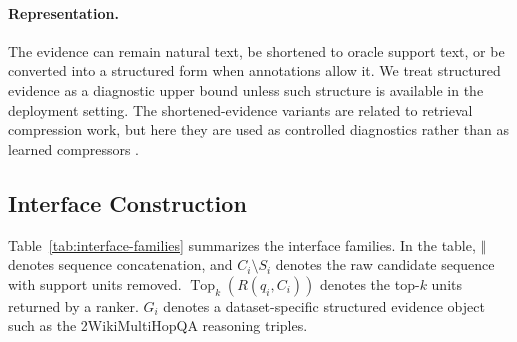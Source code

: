 \documentclass[a4paper,fleqn]{cas-sc}
\begin{document}
\paragraph{Representation.}
The evidence can remain natural text, be shortened to oracle support text, or be
converted into a structured form when annotations allow it. We treat structured
evidence as a diagnostic upper bound unless such structure is available in the
deployment setting. The shortened-evidence variants are related to retrieval
compression work, but here they are used as controlled diagnostics rather than
as learned compressors \citep{xu2023recomp,jiang2023longllmlingua}.

\subsection{Interface Construction}

Table~\ref{tab:interface-families} summarizes the interface families. In the
table, $\Vert$ denotes sequence concatenation, and $C_i \setminus S_i$ denotes
the raw candidate sequence with support units removed.
$\operatorname{Top}_k(R(q_i,C_i))$ denotes the top-$k$ units returned by a
ranker. $G_i$ denotes a dataset-specific structured evidence object such as the
2WikiMultiHopQA reasoning triples.
\end{document}
